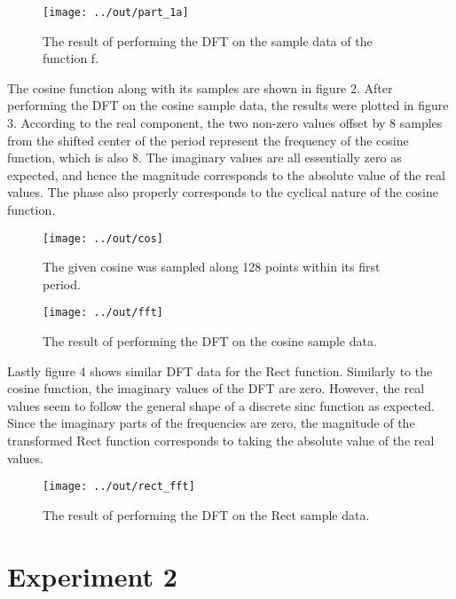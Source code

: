 \documentclass[headings=optiontoheadandtoc,listof=totoc,parskip=full]{scrartcl}
\begin{document}
\begin{figure}[H]
	\centering
	\texttt{[image: ../out/part\_1a]}
	\caption{The result of performing the DFT on the sample data of the function f.}
	\label{fig:part_1a}
\end{figure}

The cosine function along with its samples are shown in figure 2. After performing the DFT on the cosine sample data, the results were plotted in figure 3. According to the real component, the two non-zero values offset by 8 samples from the shifted center of the period represent the frequency of the cosine function, which is also 8. The imaginary values are all essentially zero as expected, and hence the magnitude corresponds to the absolute value of the real values. The phase also properly corresponds to the cyclical nature of the cosine function.

\begin{figure}[H]
	\centering
	\texttt{[image: ../out/cos]}
	\caption{The given cosine was sampled along 128 points within its first period.}
	\label{fig:cos}
\end{figure}

\begin{figure}[H]
	\centering
	\texttt{[image: ../out/fft]}
	\caption{The result of performing the DFT on the cosine sample data.}
	\label{fig:fft}
\end{figure}

Lastly figure 4 shows similar DFT data for the Rect function. Similarly to the cosine function, the imaginary values of the DFT are zero. However, the real values seem to follow the general shape of a discrete sinc function as expected. Since the imaginary parts of the frequencies are zero, the magnitude of the transformed Rect function corresponds to taking the absolute value of the real values.

\begin{figure}[H]
	\centering
	\texttt{[image: ../out/rect\_fft]}
	\caption{The result of performing the DFT on the Rect sample data.}
	\label{fig:rect_fft}
\end{figure}


\section{Experiment 2}
\label{sec:exp-2}
\end{document}
